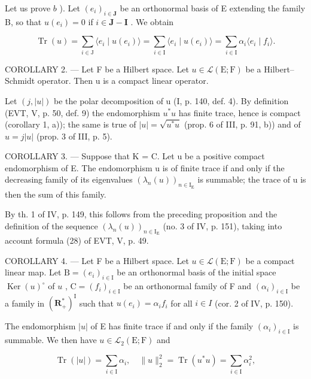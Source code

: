 Let us prove \(b\) ). Let \((e_i)_{i \in \mathbf{J}}\) be an orthonormal basis of E extending the family B, so that \(u(e_i) = 0\) if \(i \in \mathbf{J} - \mathbf{I}\) . We obtain

\[
\operatorname{Tr} (u) = \sum_ {i \in \mathrm{J}} \langle e _ {i} \mid u (e _ {i}) \rangle = \sum_ {i \in \mathrm{I}} \langle e _ {i} \mid u (e _ {i}) \rangle = \sum_ {i \in \mathrm{I}} \alpha_ {i} \langle e _ {i} \mid f _ {i} \rangle .
\]

COROLLARY 2. --- Let F be a Hilbert space. Let \(u \in \mathcal{L}(\mathrm{E};\mathrm{F})\) be a Hilbert--Schmidt operator. Then u is a compact linear operator.

Let \((j,|u|)\) be the polar decomposition of u (I, p. 140, def. 4). By definition (EVT, V, p. 50, def. 9) the endomorphism \(u^{*}u\) has finite trace, hence is compact (corollary 1, a)); the same is true of \(|u|=\sqrt{u^{*}u}\) (prop. 6 of III, p. 91, b)) and of \(u=j|u|\) (prop. 3 of III, p. 5).

COROLLARY 3. --- Suppose that K = C. Let u be a positive compact endomorphism of E. The endomorphism u is of finite trace if and only if the decreasing family of its eigenvalues \((\lambda_{n}(u))_{n\in\mathrm{I}_{\mathrm{E}}}\) is summable; the trace of u is then the sum of this family.

By th. 1 of IV, p. 149, this follows from the preceding proposition and the definition of the sequence \((\lambda_n(u))_{n\in \mathrm{I_E}}\) (no. 3 of IV, p. 151), taking into account formula (28) of EVT, V, p. 49.

COROLLARY 4. --- Let F be a Hilbert space. Let \(u \in \mathcal{L}(\mathrm{E};\mathrm{F})\) be a compact linear map. Let \(\mathrm{B} = (e_i)_{i \in \mathrm{I}}\) be an orthonormal basis of the initial space \(\operatorname{Ker}(u)^{\circ}\) of \(u\) , \(\mathrm{C} = (f_i)_{i \in \mathrm{I}}\) be an orthonormal family of F and \((\alpha_{i})_{i\in\mathrm{I}}\) be a family in \((\mathbf{R}_{+}^{*})^{\mathrm{I}}\) such that \(u(e_{i})=\alpha_{i}f_{i}\) for all \(i\in I\) (cor. 2 of IV, p. 150).

The endomorphism \(|u|\) of E has finite trace if and only if the family \((\alpha_{i})_{i\in \mathrm{I}}\) is summable. We then have \(u\in \mathcal{L}_2(\mathrm{E};\mathrm{F})\) and

\[
\operatorname{Tr} (| u |) = \sum_ {i \in \mathrm{I}} \alpha_ {i}, \quad \| u \| _ {2} ^ {2} = \operatorname{Tr} (u ^ {*} u) = \sum_ {i \in \mathrm{I}} \alpha_ {i} ^ {2},\tag{8}
\]

